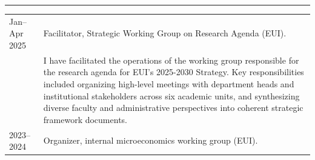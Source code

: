 \hrule %
\vspace{2mm}

\begin{longtable}[l]{@{}p{} p{}}
    Jan--Apr 2025& Facilitator, Strategic Working Group on Research Agenda (EUI). \\
    & I have facilitated the operations of the working group responsible for the research agenda for EUI's 2025-2030 Strategy. Key responsibilities included organizing high-level meetings with department heads and institutional stakeholders across six academic units, and synthesizing diverse faculty and administrative perspectives into coherent strategic framework documents. \\[8pt]
    2023--2024 & Organizer, internal microeconomics working group (EUI). \\

\end{longtable}


% 

    


